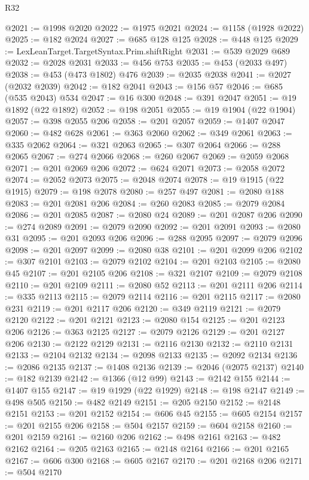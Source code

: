\begin{lexlean}{R32}
\begin{coremodule}
@2021 := @1998 @2020
@2022 := @1975 @2021
@2024 := @1158 (@1928 @2022)
@2025 := @182 @2024
@2027 := @685 @128 @125
@2028 := @448 @125
@2029 := LexLeanTarget.TargetSyntax.Prim.shiftRight
@2031 := @539 @2029 @689
@2032 := @2028 @2031
@2033 := @456 @753
@2035 := @453 (@2033 @497)
@2038 := @453 (@473 @1802) @476
@2039 := @2035 @2038
@2041 := @2027 (@2032 @2039)
@2042 := @182 @2041
@2043 := @156 @57
@2046 := @685 (@535 @2043) @534
@2047 := @16 @300
@2048 := @391 @2047
@2051 := @19 @1892 (@22 @1892)
@2052 := @198 @2051
@2055 := @19 @1904 (@22 @1904)
@2057 := @398 @2055 @206
@2058 := @201 @2057
@2059 := @1407 @2047
@2060 := @482 @628
@2061 := @363 @2060
@2062 := @349 @2061
@2063 := @335 @2062
@2064 := @321 @2063
@2065 := @307 @2064
@2066 := @288 @2065
@2067 := @274 @2066
@2068 := @260 @2067
@2069 := @2059 @2068
@2071 := @201 @2069 @206
@2072 := @624 @2071
@2073 := @2058 @2072
@2074 := @2052 @2073
@2075 := @2048 @2074
@2078 := @19 @1915 (@22 @1915)
@2079 := @198 @2078
@2080 := @257 @497
@2081 := @2080 @188
@2083 := @201 @2081 @206
@2084 := @260 @2083
@2085 := @2079 @2084
@2086 := @201 @2085
@2087 := @2080 @24
@2089 := @201 @2087 @206
@2090 := @274 @2089
@2091 := @2079 @2090
@2092 := @201 @2091
@2093 := @2080 @31
@2095 := @201 @2093 @206
@2096 := @288 @2095
@2097 := @2079 @2096
@2098 := @201 @2097
@2099 := @2080 @38
@2101 := @201 @2099 @206
@2102 := @307 @2101
@2103 := @2079 @2102
@2104 := @201 @2103
@2105 := @2080 @45
@2107 := @201 @2105 @206
@2108 := @321 @2107
@2109 := @2079 @2108
@2110 := @201 @2109
@2111 := @2080 @52
@2113 := @201 @2111 @206
@2114 := @335 @2113
@2115 := @2079 @2114
@2116 := @201 @2115
@2117 := @2080 @231
@2119 := @201 @2117 @206
@2120 := @349 @2119
@2121 := @2079 @2120
@2122 := @201 @2121
@2123 := @2080 @154
@2125 := @201 @2123 @206
@2126 := @363 @2125
@2127 := @2079 @2126
@2129 := @201 @2127 @206
@2130 := @2122 @2129
@2131 := @2116 @2130
@2132 := @2110 @2131
@2133 := @2104 @2132
@2134 := @2098 @2133
@2135 := @2092 @2134
@2136 := @2086 @2135
@2137 := @1408 @2136
@2139 := @2046 (@2075 @2137)
@2140 := @182 @2139
@2142 := @1366 (@12 @99)
@2143 := @2142 @155
@2144 := @1407 @155
@2147 := @19 @1929 (@22 @1929)
@2148 := @198 @2147
@2149 := @498 @505
@2150 := @482 @2149
@2151 := @205 @2150
@2152 := @2148 @2151
@2153 := @201 @2152
@2154 := @606 @45
@2155 := @605 @2154
@2157 := @201 @2155 @206
@2158 := @504 @2157
@2159 := @604 @2158
@2160 := @201 @2159
@2161 := @2160 @206
@2162 := @498 @2161
@2163 := @482 @2162
@2164 := @205 @2163
@2165 := @2148 @2164
@2166 := @201 @2165
@2167 := @606 @300
@2168 := @605 @2167
@2170 := @201 @2168 @206
@2171 := @504 @2170

\end{coremodule}
\end{lexlean}
